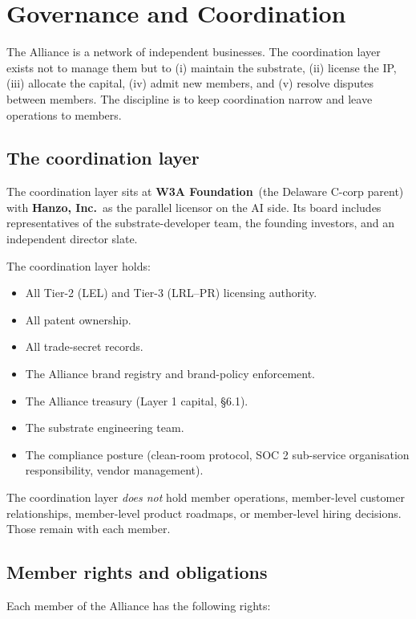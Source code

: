 \section{Governance and Coordination}

The Alliance is a network of independent businesses. The coordination
layer exists not to manage them but to (i) maintain the substrate, (ii)
license the IP, (iii) allocate the capital, (iv) admit new members, and
(v) resolve disputes between members. The discipline is to keep
coordination narrow and leave operations to members.

\subsection{The coordination layer}

The coordination layer sits at \textbf{W3A Foundation}\ (the
Delaware C-corp parent) with \textbf{Hanzo, Inc.}\ as the parallel
licensor on the AI side. Its board includes representatives of the
substrate-developer team, the founding investors, and an independent
director slate.

The coordination layer holds:

\begin{itemize}[leftmargin=2em,itemsep=0.1em]
\item All Tier-2 (LEL) and Tier-3 (LRL--PR) licensing authority.
\item All patent ownership.
\item All trade-secret records.
\item The Alliance brand registry and brand-policy enforcement.
\item The Alliance treasury (Layer 1 capital, \S 6.1).
\item The substrate engineering team.
\item The compliance posture (clean-room protocol, SOC 2 sub-service
organisation responsibility, vendor management).
\end{itemize}

The coordination layer \emph{does not} hold member operations,
member-level customer relationships, member-level product roadmaps, or
member-level hiring decisions. Those remain with each member.

\subsection{Member rights and obligations}

Each member of the Alliance has the following rights:

